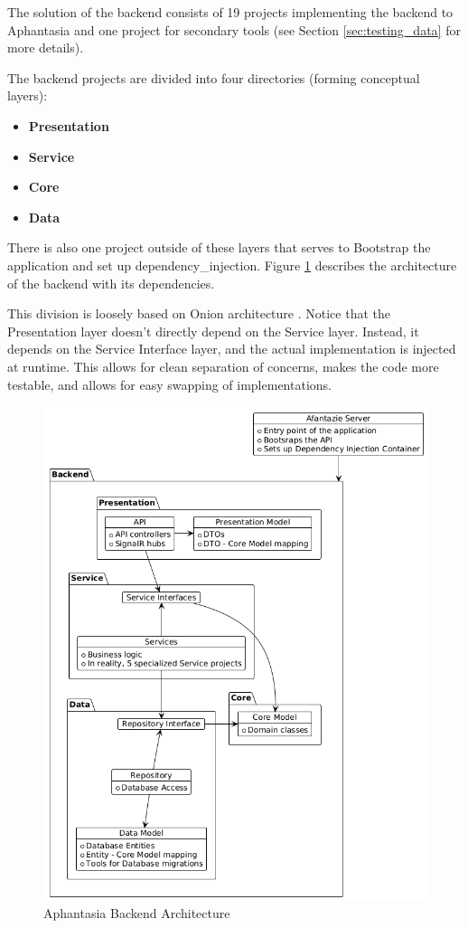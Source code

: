 The solution of the backend consists of 19 projects implementing the backend to Aphantasia and one project for secondary tools
(see Section \ref{sec:testing_data} for more details). 

The backend projects are divided into four directories (forming conceptual layers):
\begin{itemize}
    \item \textbf{Presentation}
    \item \textbf{Service}
    \item \textbf{Core} 
    \item \textbf{Data}
\end{itemize}

There is also one project outside of these layers that serves to Bootstrap the application and set up \gls{dependency_injection}.
Figure \ref{obr:afantazie_backend_architecture} describes the architecture of the backend with its dependencies.

This division is loosely based on Onion architecture \cite{onion_architecture}. Notice that the Presentation layer doesn't directly depend on the Service layer.
Instead, it depends on the Service Interface layer, and the actual implementation is injected at runtime.
This allows for clean separation of concerns, makes the code more testable, and allows for easy swapping of implementations.

\begin{figure}[h]\centering
    \includegraphics[width=140mm]{img/backend_architecture.png}
    \caption{Aphantasia Backend Architecture}
    \label{obr:afantazie_backend_architecture}
\end{figure}

